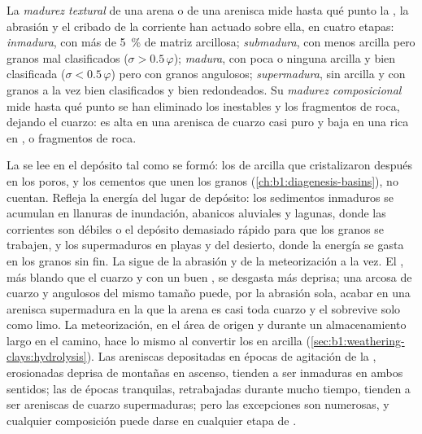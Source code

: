 \begin{definition}\label{def:b1:clastic-sediments:maturity}
La \emph{madurez textural} de una arena o de una arenisca mide hasta qué punto la , la abrasión y el cribado de la corriente han
actuado sobre ella, en cuatro etapas: \emph{inmadura}, con más de \qty{5}{\percent} de matriz arcillosa; \emph{submadura}, con menos arcilla pero granos mal clasificados
($\sigma > 0.5\,\varphi$); \emph{madura}, con poca o ninguna arcilla y bien clasificada ($\sigma < 0.5\,\varphi$) pero con granos angulosos;
\emph{supermadura}, sin arcilla y con granos a la vez bien clasificados y bien redondeados. Su \emph{madurez composicional} mide hasta qué punto
se han eliminado los  inestables y los fragmentos de roca, dejando el cuarzo: es alta en una arenisca de cuarzo casi puro y baja en una rica en ,  o
fragmentos de roca.
\end{definition}

La  se lee en el depósito tal como se formó: los  de arcilla que cristalizaron después en los poros, y los cementos que unen los granos
(\cref{ch:b1:diagenesis-basins}), no cuentan. Refleja la energía del lugar de depósito: los sedimentos inmaduros se acumulan en llanuras de inundación, abanicos aluviales
y lagunas, donde las corrientes son débiles o el depósito demasiado rápido para que los granos se trabajen, y los supermaduros en playas y  del desierto, donde la energía
se gasta en los granos sin fin. La  sigue de la abrasión y de la meteorización a la vez. El , más blando que el cuarzo y con un buen ,
se desgasta más deprisa; una arcosa de cuarzo y  angulosos del mismo tamaño puede, por la abrasión sola, acabar en una arenisca supermadura en la que la arena es casi
toda cuarzo y el  sobrevive solo como limo. La meteorización, en el área de origen y durante un almacenamiento largo en el camino, hace lo mismo al convertir los
 en arcilla (\cref{sec:b1:weathering-clays:hydrolysis}). Las areniscas depositadas en épocas de agitación de la , erosionadas deprisa de montañas en
ascenso, tienden a ser inmaduras en ambos sentidos; las de épocas tranquilas, retrabajadas durante mucho tiempo, tienden a ser areniscas de cuarzo supermaduras; pero las
excepciones son numerosas, y cualquier composición puede darse en cualquier etapa de .


